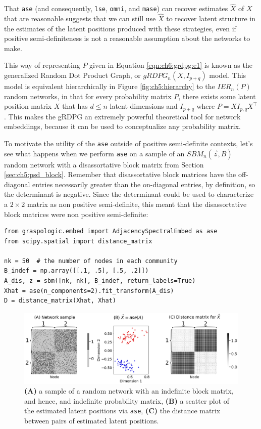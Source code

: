 That \texttt{ase} (and consequently, \texttt{lse}, \texttt{omni}, and \texttt{mase}) can recover estimates $\hat X$ of $X$ that are reasonable suggests that we can still use $\hat X$ to recover latent structure in the estimates of the latent positions produced with these strategies, even if positive semi-definiteness is not a reasonable assumption about the networks to make.

This way of representing $P$ given in Equation \eqref{eqn:ch6:grdpg:e1} is known as the generalized Random Dot Product Graph, or $gRDPG_n\left(X, I_{p + q}\right)$ model. This model is equivalent hierarchically in Figure \ref{fig:ch5:hierarchy} to the $IER_n(P)$ random networks, in that for every probability matrix $P$, there exists some latent position matrix $X$ that has $d \leq n$ latent dimensions  and $I_{p + q}$ where $P = XI_{p,q}X^\top$. This makes the gRDPG an extremely powerful theoretical tool for network embeddings, because it can be used to conceptualize any probability matrix. 

To motivate the utility of the \texttt{ase} outside of positive semi-definite contexts, let's see what happens when we perform \texttt{ase} on a sample of an $SBM_n(\vec z, B)$ random network with a disassortative block matrix from Section \ref{sec:ch5:psd_block}. Remember that disassortative block matrices have the off-diagonal entries necessarily greater than the on-diagonal entries, by definition, so the determinant is negative. Since the determinant could be used to characterize a $2 \times 2$ matrix as non positive semi-definite, this meant that the disassortative block matrices were non positive semi-definite:

\begin{lstlisting}[style=python]
from graspologic.embed import AdjacencySpectralEmbed as ase
from scipy.spatial import distance_matrix

nk = 50  # the number of nodes in each community
B_indef = np.array([[.1, .5], [.5, .2]])
A_dis, z = sbm([nk, nk], B_indef, return_labels=True)
Xhat = ase(n_components=2).fit_transform(A_dis)
D = distance_matrix(Xhat, Xhat)
\end{lstlisting}

\begin{figure}[h]
    \centering
    \includegraphics[width=\linewidth]{representations/ch6/Images/diss.png}
    \caption[ASE with indefinite probability matrix]{\textbf{(A)} a sample of a random network with an indefinite block matrix, and hence, and indefinite probability matrix, \textbf{(B)} a scatter plot of the estimated latent positions via \texttt{ase}, \textbf{(C)} the distance matrix between pairs of estimated latent positions.}
    \label{fig:ch6:dimest:diss}
\end{figure}

